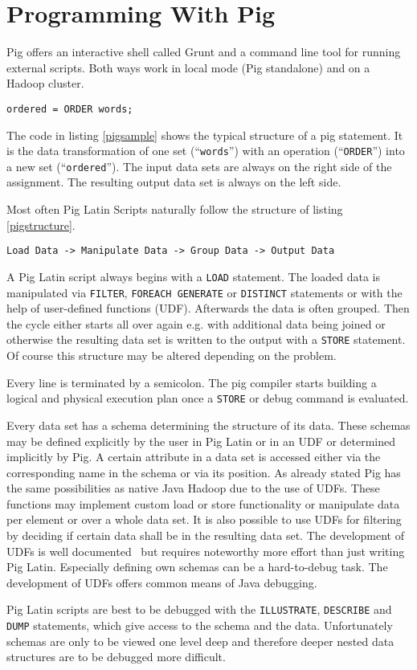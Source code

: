 \section{Programming With Pig}

Pig offers an interactive shell called Grunt and a command line tool for running external scripts. Both ways work in local mode (Pig standalone) and on a Hadoop cluster.

\begin{lstlisting}[language=pig,caption=A typical Pig line of code,label=pigsample]
ordered = ORDER words;
\end{lstlisting} 

The code in listing \ref{pigsample} shows the typical structure of a pig statement. It is the data transformation of one set (``{\tt words}'') with an operation (``{\tt ORDER}'') into a new set (``{\tt ordered}''). The input data sets are always on the right side of the assignment. The resulting output data set is always on the left side.

Most often Pig Latin Scripts naturally follow the structure of listing \ref{pigstructure}.

\begin{lstlisting}[language=jaql,caption=Pig Latin Script Structure ,label=pigstructure]
Load Data -> Manipulate Data -> Group Data -> Output Data
\end{lstlisting}
                                                       
A Pig Latin script always begins with a {\tt LOAD} statement. The loaded data is manipulated via {\tt FILTER}, {\tt FOREACH GENERATE} or {\tt DISTINCT} statements or with the help of user-defined functions (UDF). Afterwards the data is often grouped. Then the cycle either starts all over again e.g. with additional data being joined or otherwise the resulting data set is written to the output with a {\tt STORE} statement. Of course this structure may be altered depending on the problem.     

Every line is terminated by a semicolon. The pig compiler starts building a logical and physical execution plan once a {\tt STORE} or debug command is evaluated.
                   
Every data set has a schema determining the structure of its data. These schemas may be defined explicitly by the user in Pig Latin or in an UDF or determined implicitly by Pig. A certain attribute in a data set is accessed either via the corresponding name in the schema or via its position.
As already stated Pig has the same possibilities as native Java Hadoop due to the use of UDFs. These functions may implement custom load or store functionality or manipulate data per element or over a whole data set. It is also possible to use UDFs for filtering by deciding if certain data shall be in the resulting data set.
The development of UDFs is well documented~\cite{pigUdf} but requires noteworthy more effort than just writing Pig Latin. Especially defining own schemas can be a hard-to-debug task. The development of UDFs offers common means of Java debugging.

Pig Latin scripts are best to be debugged with the {\tt ILLUSTRATE}, {\tt DESCRIBE} and {\tt DUMP} statements, which give access to the schema and the data. Unfortunately schemas are only to be viewed one level deep and therefore deeper nested data structures are to be debugged more difficult.